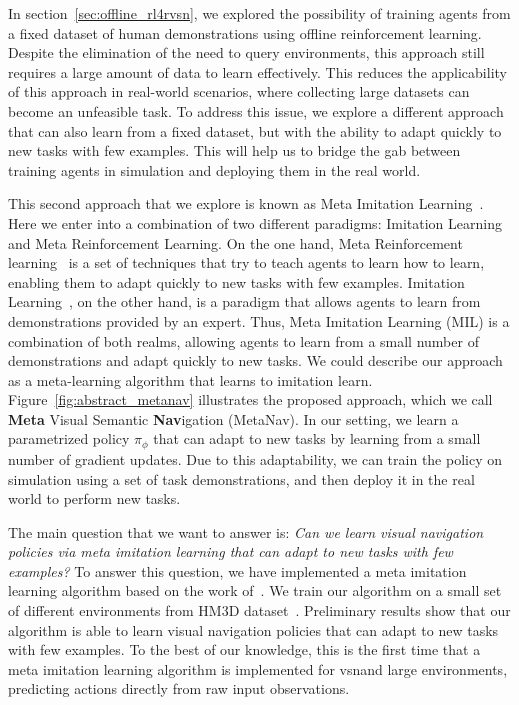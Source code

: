 In section~\ref{sec:offline_rl4rvsn}, we explored the possibility of training agents from a fixed dataset of human demonstrations using offline reinforcement learning.
Despite the elimination of the need to query environments, this approach still requires a large amount of data to learn effectively.
This reduces the applicability of this approach in real-world scenarios, where collecting large datasets can become an unfeasible task.
To address this issue, we explore a different approach that can also learn from a fixed dataset, but with the ability to adapt quickly to new tasks with few examples.
This will help us to bridge the gab between training agents in simulation and deploying them in the real world.

This second approach that we explore is known as Meta Imitation Learning~\cite{finnOneShotVisualImitation2017}.
Here we enter into a combination of two different paradigms: Imitation Learning and Meta Reinforcement Learning.
On the one hand, Meta Reinforcement learning~\cite{Beck_2025} is a set of techniques that try to teach agents to learn how to learn, enabling them to adapt quickly to new tasks with few examples.
Imitation Learning~\cite{10602544}, on the other hand, is a paradigm that allows agents to learn from demonstrations provided by an expert.
Thus, Meta Imitation Learning (MIL) is a combination of both realms, allowing agents to learn from a small number of demonstrations and adapt quickly to new tasks.
We could describe our approach as a meta-learning algorithm that learns to imitation learn.
Figure~\ref{fig:abstract_metanav} illustrates the proposed approach, which we call \textbf{Meta} Visual Semantic \textbf{Nav}igation (MetaNav).
In our setting, we learn a parametrized policy $\pi_\phi$ that can adapt to new tasks by learning from a small number of gradient updates.
Due to this adaptability, we can train the policy on simulation using a set of task demonstrations, and then deploy it in the real world to perform new tasks.

The main question that we want to answer is: \textit{Can we learn visual navigation policies via meta imitation learning that can adapt to new tasks with few examples?}
To answer this question, we have implemented a meta imitation learning algorithm based on the work of~\cite{finnOneShotVisualImitation2017}.
We train our algorithm on a small set of different environments from HM3D dataset~\cite{Ramakrishnan2021HabitatMatterport3D}.
Preliminary results show that our algorithm is able to learn visual navigation policies that can adapt to new tasks with few examples.
To the best of our knowledge, this is the first time that a meta imitation learning algorithm is implemented for \acrshort{vsn}\@ and large environments, predicting actions directly from raw input observations.

